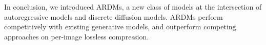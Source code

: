 \documentclass{article} \usepackage{iclr2022_conference,times}
\begin{document}
In conclusion, we introduced ARDMs, a new class of models at the intersection of autoregressive models and discrete diffusion models. ARDMs perform competitively with existing generative models, and outperform competing approaches on per-image lossless compression.  
\end{document}
